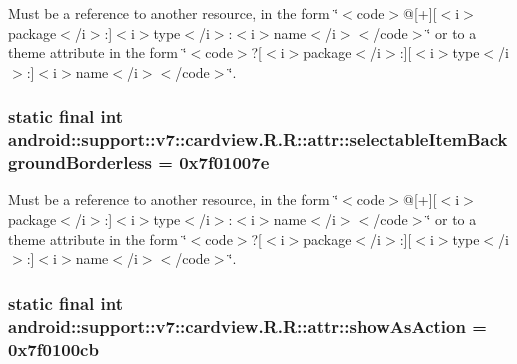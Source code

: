 Must be a reference to another resource, in the form \char`\"{}$<$code$>$@\mbox{[}+\mbox{]}\mbox{[}$<$i$>$package$<$/i$>$:\mbox{]}$<$i$>$type$<$/i$>$:$<$i$>$name$<$/i$>$$<$/code$>$\char`\"{} or to a theme attribute in the form \char`\"{}$<$code$>$?\mbox{[}$<$i$>$package$<$/i$>$:\mbox{]}\mbox{[}$<$i$>$type$<$/i$>$:\mbox{]}$<$i$>$name$<$/i$>$$<$/code$>$\char`\"{}. \hypertarget{classandroid_1_1support_1_1v7_1_1cardview_1_1_r_1_1attr_7ec98ca619f96811b7a4646533046c64}{
\subsubsection[{selectableItemBackgroundBorderless}]{\setlength{\rightskip}{0pt plus 5cm}static final int android::support::v7::cardview.R.R::attr::selectableItemBackgroundBorderless = 0x7f01007e}}
\label{classandroid_1_1support_1_1v7_1_1cardview_1_1_r_1_1attr_7ec98ca619f96811b7a4646533046c64}


Must be a reference to another resource, in the form \char`\"{}$<$code$>$@\mbox{[}+\mbox{]}\mbox{[}$<$i$>$package$<$/i$>$:\mbox{]}$<$i$>$type$<$/i$>$:$<$i$>$name$<$/i$>$$<$/code$>$\char`\"{} or to a theme attribute in the form \char`\"{}$<$code$>$?\mbox{[}$<$i$>$package$<$/i$>$:\mbox{]}\mbox{[}$<$i$>$type$<$/i$>$:\mbox{]}$<$i$>$name$<$/i$>$$<$/code$>$\char`\"{}. \hypertarget{classandroid_1_1support_1_1v7_1_1cardview_1_1_r_1_1attr_3d449aa5efe2fdad10093c428a0d0715}{
\subsubsection[{showAsAction}]{\setlength{\rightskip}{0pt plus 5cm}static final int android::support::v7::cardview.R.R::attr::showAsAction = 0x7f0100cb}}
\label{classandroid_1_1support_1_1v7_1_1cardview_1_1_r_1_1attr_3d449aa5efe2fdad10093c428a0d0715}


